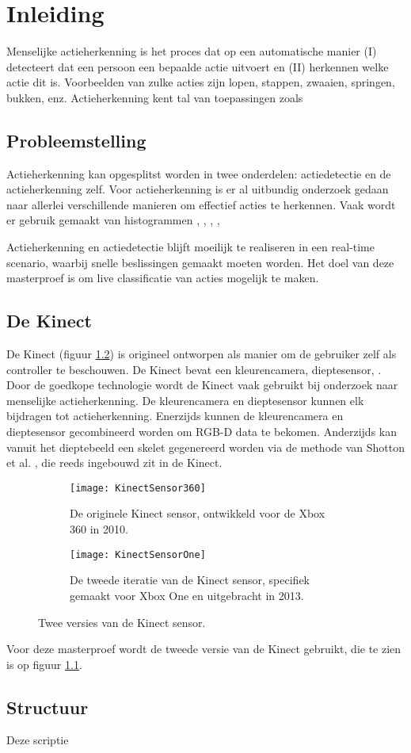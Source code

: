 \setcounter{page}{1}
\chapter{Inleiding}
\label{ch:Inleiding}
Menselijke actieherkenning is het proces dat op een automatische manier (I) detecteert dat een persoon een bepaalde actie uitvoert en (II) herkennen welke actie dit is. Voorbeelden van zulke acties zijn lopen, stappen, zwaaien, springen, bukken, enz. Actieherkenning kent tal van toepassingen zoals 




\section{Probleemstelling}
Actieherkenning kan opgesplitst worden in twee onderdelen: actiedetectie en de actieherkenning zelf. Voor actieherkenning is er al uitbundig onderzoek gedaan naar allerlei verschillende manieren om effectief acties te herkennen. Vaak wordt er gebruik gemaakt van histogrammen \cite{Xia2012},
\cite{Chen2017},
\cite{Vezzani2010},
\cite{Mendoza2007}, 


Actieherkenning en actiedetectie blijft moeilijk te realiseren in een real-time scenario, waarbij snelle beslissingen gemaakt moeten worden. Het doel van deze masterproef is om live classificatie van acties mogelijk te maken. 



\section{De Kinect}
De Kinect (figuur \ref{fig:KinectSensorVersies}) is origineel ontworpen als manier om de gebruiker zelf als controller te beschouwen. De Kinect bevat een kleurencamera, dieptesensor, . Door de goedkope technologie wordt de Kinect vaak gebruikt bij onderzoek naar menselijke actieherkenning. De kleurencamera en dieptesensor kunnen elk bijdragen tot actieherkenning. Enerzijds kunnen de kleurencamera en dieptesensor gecombineerd worden om RGB-D data te bekomen. Anderzijds kan vanuit het dieptebeeld een skelet gegenereerd worden via de methode van Shotton et al. \cite{Shotton2011}, die reeds ingebouwd zit in de Kinect.
\begin{figure}
	\begin{subfigure}[t]{0.48\textwidth}
		\texttt{[image: KinectSensor360]}
		\caption{De originele Kinect sensor, ontwikkeld voor de Xbox 360 in 2010.}
	\end{subfigure}
	\begin{subfigure}[t]{0.48\textwidth}
		\texttt{[image: KinectSensorOne]}
		\caption{De tweede iteratie van de Kinect sensor, specifiek gemaakt voor Xbox One en uitgebracht in 2013.}
		\label{fig:KinectSensorOne}
	\end{subfigure}
	\caption{Twee versies van de Kinect sensor.}
	\label{fig:KinectSensorVersies}
\end{figure}

Voor deze masterproef wordt de tweede versie van de Kinect gebruikt, die te zien is op figuur \ref{fig:KinectSensorOne}.


\section{Structuur}
Deze scriptie 
